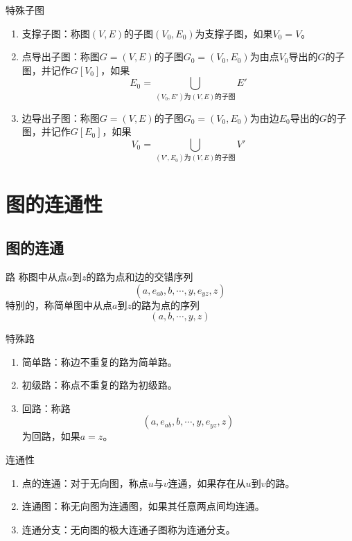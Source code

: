 \documentclass[lang = cn, scheme = chinese, thmcnt = section]{elegantbook}
\begin{document}
\begin{definition}{特殊子图}
	\begin{enumerate}
		\item 支撑子图：称图$(V,E)$的子图$(V_0,E_0)$为支撑子图，如果$V_0=V$。
		\item 点导出子图：称图$G=(V,E)$的子图$G_0=(V_0,E_0)$为由点$V_0$导出的$G$的子图，并记作$G[V_0]$，如果
		$$
		E_0=\bigcup_{(V_0,E')\text{为}(V,E)\text{的子图}}E'
		$$
		\item 边导出子图：称图$G=(V,E)$的子图$G_0=(V_0,E_0)$为由边$E_0$导出的$G$的子图，并记作$G[E_0]$，如果
		$$
		V_0=\bigcup_{(V',E_0)\text{为}(V,E)\text{的子图}}V'
		$$
	\end{enumerate}
\end{definition}

\section{图的连通性}

\subsection{图的连通}

\begin{definition}{路}
	称图中从点$a$到$z$的路为点和边的交错序列
	$$
	(a,e_{ab},b,\cdots,y,e_{yz},z)
	$$
	特别的，称简单图中从点$a$到$z$的路为点的序列
	$$
	(a,b,\cdots,y,z)
	$$
\end{definition}

\begin{definition}{特殊路}
	\begin{enumerate}
		\item 简单路：称边不重复的路为简单路。
		\item 初级路：称点不重复的路为初级路。
		\item 回路：称路
		$$
		(a,e_{ab},b,\cdots,y,e_{yz},z)
		$$
		为回路，如果$a=z$。
	\end{enumerate}
\end{definition}

\begin{definition}{连通性}
	\begin{enumerate}
		\item 点的连通：对于无向图，称点$u$与$v$连通，如果存在从$u$到$v$的路。
		\item 连通图：称无向图为连通图，如果其任意两点间均连通。
		\item 连通分支：无向图的极大连通子图称为连通分支。
	\end{enumerate}
\end{definition}
\end{document}
